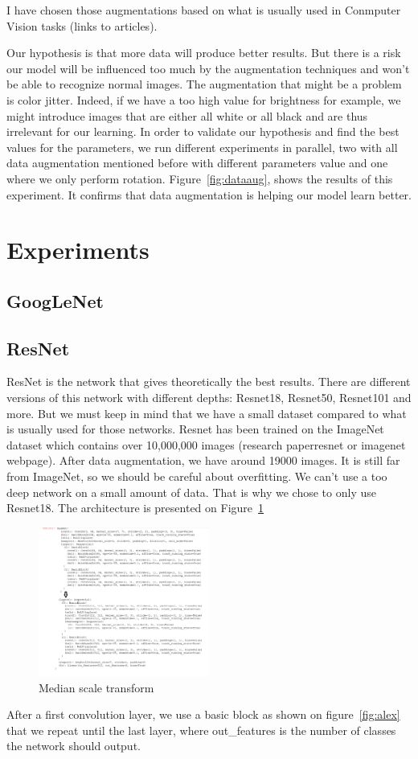 I have chosen those augmentations based on what is usually used in Conmputer Vision tasks (links to articles).

Our hypothesis is that more data will produce better results. But there is a risk our model will be influenced too much by the augmentation techniques and won't be able to recognize normal images.  The augmentation that might be a problem is color jitter. Indeed, if we have a too high value for brightness for example, we might introduce images that are either all white or all black and are thus irrelevant for our learning. 
In order to validate our hypothesis and find the best values for the parameters, we run different experiments in parallel, two with all data augmentation mentioned before with different parameters value and one where we only perform rotation. Figure~\ref{fig:dataaug}, shows the results of this experiment. It confirms that data augmentation is helping our model learn better.

\section{Experiments}
\subsection{GoogLeNet}
\subsection{ResNet}
ResNet is the network that gives theoretically the best results. There are different versions of this network with different depths: Resnet18, Resnet50, Resnet101 and more. But we must keep in mind that we have a small dataset compared to what is usually used for those networks. Resnet has been trained on the ImageNet dataset which contains over 10,000,000 images (research paperresnet or imagenet webpage). After data augmentation, we have around 19000 images. It is still far from ImageNet, so we should be careful about overfitting. We can't use a too deep network on a small amount of data. That is why we chose to only use Resnet18. The architecture is presented on Figure~\ref{fig:resnet}
 \begin{figure}[h]
    \centering
        \includegraphics[width=0.5\textwidth]{./figures/03-Resnet_architecture}
        \caption{Median scale transform}\label{fig:resnet}
\end{figure}
After a first convolution layer, we use a basic block as shown on figure~\ref{fig:alex} that we repeat until the last layer, where out\_features is the number of classes the network should output. 
